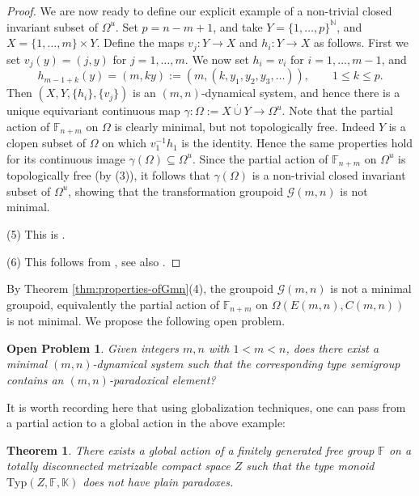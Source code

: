 \documentclass[11pt]{amsart}
\theoremstyle{plain}            %
\newtheorem{theorem}{Theorem}[section]
\newtheorem{openproblem}{Open Problem}
\theoremstyle{definition}       %
\theoremstyle{definition}       %
\theoremstyle{remark}
\newcommand{\Typ}{\mathrm{Typ}}
\begin{document}
\begin{proof}
We are now ready to define our explicit example of a non-trivial closed invariant subset of $\Omega^u$. Set $p= n-m+1$, and take $Y= \{1,\dots ,p \}^{\mathbb N}$, and $X= \{1,\dots ,m \} \times Y$. 
Define the maps $v_j \colon Y\to X$ and $h_i\colon Y\to X$ as follows. First we set $v_j(y) = (j,y)$ for $j=1,\dots , m$. We now set $h_i= v_i$ for $i=1,\dots , m-1$, and 
$$h_{m-1+k} (y) = (m,ky) := (m, (k,y_1,y_2,y_3,\dots )), \qquad 1\le k\le p .$$
Then $(X,Y,\{h_i\},\{v_j\})$ is an $(m,n)$-dynamical system, and hence there is a unique equivariant continuous map $\gamma \colon \Omega := X\overset{\cdot}{\cup} Y \to \Omega^u$.
Note that the partial action of $\mathbb F_{n+m}$ on $\Omega$ is clearly minimal, but not topologically free. Indeed $Y$ is a clopen subset of $\Omega$ on which $v_1^{-1}h_1$ is the identity. 
Hence the same properties hold for its continuous image $\gamma (\Omega) \subseteq \Omega^u$. Since the partial action of $\mathbb F_{n+m}$ on $\Omega^u$ is topologically free (by (3)), it follows that $\gamma (\Omega)$ is a non-trivial closed invariant subset of $\Omega^u$, showing that the transformation groupoid $\mathcal G (m,n)$ is not minimal.

(5) This is \cite[Example 9.12(1)]{al18}.

(6) This follows from \cite[Theorem 7.2]{aek13}, see also \cite[Theorem 5.1]{lolk-nuc}. 
\end{proof}

By Theorem \ref{thm:properties-ofGmn}(4), the groupoid $\mathcal G (m,n)$ is not a minimal groupoid, equivalently the partial action of $\mathbb F_{n+m}$ on $\Omega (E(m,n),C(m,n))$ is not minimal. We propose the following open problem.

\begin{openproblem}
\label{opp:simple-groupoid}
Given integers $m,n$ with $1<m<n$,
does there exist a minimal $(m,n)$-dynamical system such that the corresponding type semigroup contains an $(m,n)$-paradoxical element? 
\end{openproblem}

It is worth recording here that using globalization techniques, one can pass from a partial action to a global action in the above example:

\begin{theorem}{\rm{\cite[Corollary 7.12]{ae14}}} There exists a global action of a finitely generated free group $\mathbb F$ on a totally disconnected 
metrizable compact space $Z$ such that the type monoid $\Typ (Z,\mathbb F, \mathbb K)$ does not have plain paradoxes. 
\end{theorem}
\end{document}
